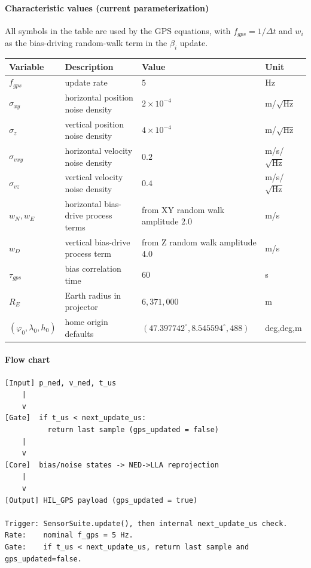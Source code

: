 \documentclass[11pt,a4paper]{article}
\begin{document}
\paragraph{Characteristic values (current parameterization)}
All symbols in the table are used by the GPS equations, with $f_{gps}=1/\Delta t$ and $w_i$ as the bias-driving random-walk term in the $\beta_i$ update.
\begin{center}
\begin{tabular}{llll}
\toprule
Variable & Description & Value & Unit \\
\midrule
$f_{gps}$ & update rate & $5$ & Hz \\
$\sigma_{xy}$ & horizontal position noise density & $2\times10^{-4}$ & m/\(\sqrt{\text{Hz}}\) \\
$\sigma_z$ & vertical position noise density & $4\times10^{-4}$ & m/\(\sqrt{\text{Hz}}\) \\
$\sigma_{vxy}$ & horizontal velocity noise density & $0.2$ & m/s/\(\sqrt{\text{Hz}}\) \\
$\sigma_{vz}$ & vertical velocity noise density & $0.4$ & m/s/\(\sqrt{\text{Hz}}\) \\
$w_N,w_E$ & horizontal bias-drive process terms & from XY random walk amplitude $2.0$ & m/s \\
$w_D$ & vertical bias-drive process term & from Z random walk amplitude $4.0$ & m/s \\
$\tau_{gps}$ & bias correlation time & $60$ & s \\
$R_E$ & Earth radius in projector & $6{,}371{,}000$ & m \\
$(\varphi_0,\lambda_0,h_0)$ & home origin defaults & $(47.397742^\circ,8.545594^\circ,488)$ & deg,deg,m \\
\bottomrule
\end{tabular}
\end{center}

\paragraph{Flow chart}
{\footnotesize
\begin{verbatim}
[Input] p_ned, v_ned, t_us
    |
    v
[Gate]  if t_us < next_update_us:
          return last sample (gps_updated = false)
    |
    v
[Core]  bias/noise states -> NED->LLA reprojection
    |
    v
[Output] HIL_GPS payload (gps_updated = true)

Trigger: SensorSuite.update(), then internal next_update_us check.
Rate:    nominal f_gps = 5 Hz.
Gate:    if t_us < next_update_us, return last sample and gps_updated=false.
\end{verbatim}
}
\end{document}
